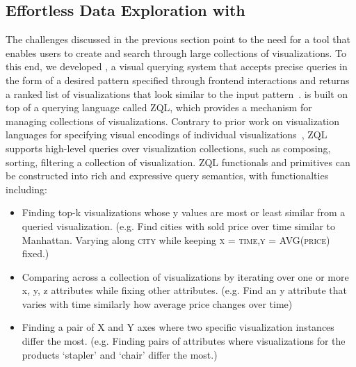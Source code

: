 \subsection{Effortless Data Exploration with \zv}
\par The challenges discussed in the previous section point to the need for a tool that enables users to create and search through large collections of visualizations. To this end, we developed \zv, a visual querying system that accepts precise queries in the form of a desired pattern specified through frontend interactions and returns a ranked list of visualizations that look similar to the input pattern~\cite{Siddiqui2016}. \zv is built on top of a querying language called ZQL, which provides a mechanism for managing collections of visualizations. Contrary to prior work on visualization languages for specifying visual encodings of individual visualizations~\cite{Stolte2002,Wilkinson2005}, ZQL supports high-level queries over visualization collections, such as composing, sorting, filtering a collection of visualization. ZQL functionals and primitives can be constructed into rich and expressive query semantics, with functionalties including: 
\begin{itemize}
	\item Finding top-k visualizations whose y values are most or least similar from a queried visualization. (e.g. Find cities with sold price over time similar to Manhattan. Varying along \textsc{city} while keeping \textsc{x = time,y = AVG(price)} fixed.) 
	\item Comparing across a collection of visualizations by iterating over one or more x, y, z attributes while fixing other attributes. (e.g. Find an y attribute that varies with time similarly how average price changes over time)
	\item Finding a pair of X and Y axes where two specific visualization instances differ the most. (e.g. Finding pairs of attributes where visualizations for the products `stapler' and `chair' differ the most.)
\end{itemize}
